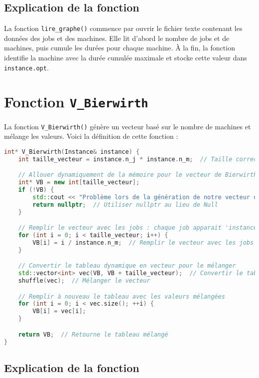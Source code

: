 \documentclass[a4paper,12pt]{article}
\begin{document}
\subsection{Explication de la fonction}

La fonction \texttt{lire\_graphe()} commence par ouvrir le fichier texte contenant les données des jobs et des machines. Elle lit d'abord le nombre de jobs et de machines, puis cumule les durées pour chaque machine. À la fin, la fonction identifie la machine avec la durée cumulée maximale et stocke cette valeur dans \texttt{instance.opt}.

\section{Fonction \texttt{V\_Bierwirth}}

La fonction \texttt{V\_Bierwirth()} génère un vecteur basé sur le nombre de machines et mélange les valeurs. Voici la définition de cette fonction :

\begin{lstlisting}[language=C++]
int* V_Bierwirth(Instance& instance) {
    int taille_vecteur = instance.n_j * instance.n_m;  // Taille correcte : nombre de jobs * nombre de machines

    // Allouer dynamiquement de la mémoire pour le vecteur de Bierwirth
    int* VB = new int[taille_vecteur];
    if (!VB) {
        std::cout << "Problème lors de la génération de notre vecteur de Bierwirth" << std::endl;
        return nullptr;  // Utiliser nullptr au lieu de Null
    }

    // Remplir le vecteur avec les jobs : chaque job apparait 'instance.n_m' fois
    for (int i = 0; i < taille_vecteur; i++) {
        VB[i] = i / instance.n_m;  // Remplir le vecteur avec les jobs
    }

    // Convertir le tableau dynamique en vecteur pour le mélanger
    std::vector<int> vec(VB, VB + taille_vecteur);  // Convertir le tableau en vecteur
    shuffle(vec);  // Mélanger le vecteur

    // Remplir à nouveau le tableau avec les valeurs mélangées
    for (int i = 0; i < vec.size(); ++i) {
        VB[i] = vec[i];
    }

    return VB;  // Retourne le tableau mélangé
}
\end{lstlisting}

\subsection{Explication de la fonction}
\end{document}
